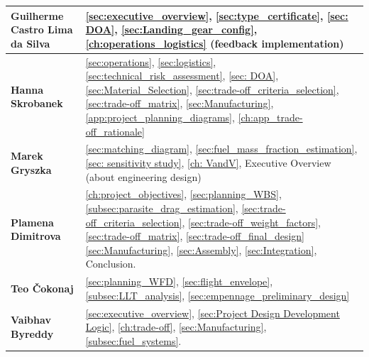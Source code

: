 \begin{table}[H]
\begin{tabularx}{\textwidth}{|>{\raggedright\arraybackslash}p{}|>{\raggedright\arraybackslash}X|}
        \textbf{Guilherme Castro Lima da Silva} 
        & \autoref{sec:executive_overview}, \autoref{sec:type_certificate}, \autoref{sec: DOA}, \autoref{sec:Landing_gear_config}, \autoref{ch:operations_logistics} (feedback implementation)\\
        \hline 

        \textbf{Hanna Skrobanek} 
        &  \autoref{sec:operations}, \autoref{sec:logistics}, \autoref{sec:technical_risk_assessment}, \autoref{sec: DOA}, \autoref{sec:Material_Selection}, \autoref{sec:trade-off_criteria_selection}, \autoref{sec:trade-off_matrix}, \autoref{sec:Manufacturing}, \autoref{app:project_planning_diagrams}, \autoref{ch:app_trade-off_rationale}\\
        \hline 

        \textbf{Marek Gryszka} 
        & \autoref{sec:matching_diagram}, \autoref{sec:fuel_mass_fraction_estimation}, \autoref{sec: sensitivity study},
        \autoref{ch: VandV},
        Executive Overview (about engineering design) \\
        \hline 

        \textbf{Plamena Dimitrova} 
        & \autoref{ch:project_objectives}, \autoref{sec:planning_WBS}, \autoref{subsec:parasite_drag_estimation}, \autoref{sec:trade-off_criteria_selection}, \autoref{sec:trade-off_weight_factors}, \autoref{sec:trade-off_matrix}, \autoref{sec:trade-off_final_design}
        \autoref{sec:Manufacturing}, \autoref{sec:Assembly}, \autoref{sec:Integration}, Conclusion. \\
        \hline 

        \textbf{Teo Čokonaj} 
        &\autoref{sec:planning_WFD},  \autoref{sec:flight_envelope}, \autoref{subsec:LLT_analysis}, \autoref{sec:empennage_preliminary_design}\\
        \hline 

        \textbf{Vaibhav Byreddy} 
        & \autoref{sec:executive_overview}, \autoref{sec:Project Design Development Logic}, \autoref{ch:trade-off}, \autoref{sec:Manufacturing}, \autoref{subsec:fuel_systems}.  \\
        \hline 
    \end{tabularx}
\end{table}

